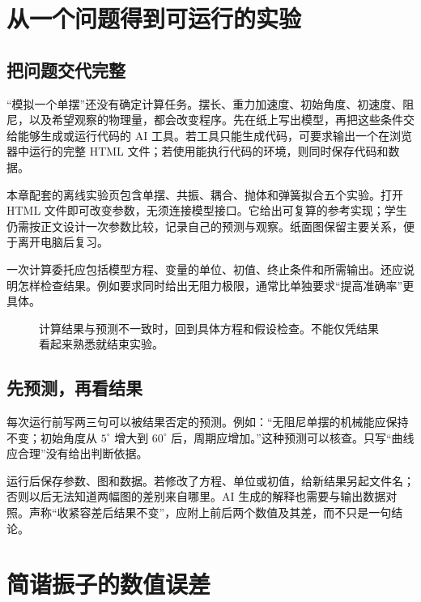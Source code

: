 \documentclass[11pt,openany,fontset=fandol]{ctexbook}
\theoremstyle{plain}\newtheorem{theorem}{定理}[chapter]\newtheorem{proposition}[theorem]{命题}
\theoremstyle{definition}\newtheorem{definition}{定义}[chapter]\newtheorem{example}{例}[chapter]
\theoremstyle{remark}\newtheorem*{remark}{说明}
\begin{document}
\section{从一个问题得到可运行的实验}
\subsection{把问题交代完整}
“模拟一个单摆”还没有确定计算任务。摆长、重力加速度、初始角度、初速度、阻尼，以及希望观察的物理量，都会改变程序。先在纸上写出模型，再把这些条件交给能够生成或运行代码的 AI 工具。若工具只能生成代码，可要求输出一个在浏览器中运行的完整 HTML 文件；若使用能执行代码的环境，则同时保存代码和数据。

本章配套的离线实验页包含单摆、共振、耦合、抛体和弹簧拟合五个实验。打开 HTML 文件即可改变参数，无须连接模型接口。它给出可复算的参考实现；学生仍需按正文设计一次参数比较，记录自己的预测与观察。纸面图保留主要关系，便于离开电脑后复习。

一次计算委托应包括模型方程、变量的单位、初值、终止条件和所需输出。还应说明怎样检查结果。例如要求同时给出无阻力极限，通常比单独要求“提高准确率”更具体。

\begin{figure}[htbp]\centering
{}
\caption{计算结果与预测不一致时，回到具体方程和假设检查。不能仅凭结果看起来熟悉就结束实验。}
\label{fig:orig-082}
\end{figure}

\subsection{先预测，再看结果}
每次运行前写两三句可以被结果否定的预测。例如：“无阻尼单摆的机械能应保持不变；初始角度从 $5^\circ$ 增大到 $60^\circ$ 后，周期应增加。”这种预测可以核查。只写“曲线应合理”没有给出判断依据。

运行后保存参数、图和数据。若修改了方程、单位或初值，给新结果另起文件名；否则以后无法知道两幅图的差别来自哪里。AI 生成的解释也需要与输出数据对照。声称“收紧容差后结果不变”，应附上前后两个数值及其差，而不只是一句结论。

\section{简谐振子的数值误差}
\end{document}

